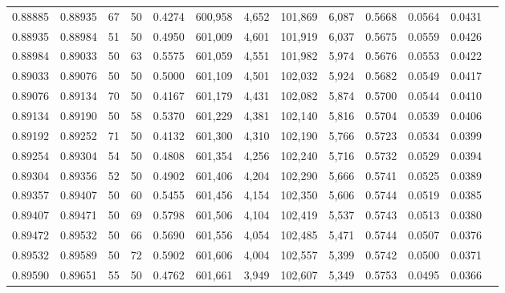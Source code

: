 \begin{tabular}{rrrrrrrrrrrrr}
0.88885 & 0.88935 &    67 &  50 &                                     0.4274 & 600,958 &   4,652 & 101,869 &   6,087 & 0.5668 & 0.0564 & 0.0431 \\
0.88935 & 0.88984 &    51 &  50 &                                     0.4950 & 601,009 &   4,601 & 101,919 &   6,037 & 0.5675 & 0.0559 & 0.0426 \\
0.88984 & 0.89033 &    50 &  63 &                                     0.5575 & 601,059 &   4,551 & 101,982 &   5,974 & 0.5676 & 0.0553 & 0.0422 \\
0.89033 & 0.89076 &    50 &  50 &                                     0.5000 & 601,109 &   4,501 & 102,032 &   5,924 & 0.5682 & 0.0549 & 0.0417 \\
0.89076 & 0.89134 &    70 &  50 &                                     0.4167 & 601,179 &   4,431 & 102,082 &   5,874 & 0.5700 & 0.0544 & 0.0410 \\
0.89134 & 0.89190 &    50 &  58 &                                     0.5370 & 601,229 &   4,381 & 102,140 &   5,816 & 0.5704 & 0.0539 & 0.0406 \\
0.89192 & 0.89252 &    71 &  50 &                                     0.4132 & 601,300 &   4,310 & 102,190 &   5,766 & 0.5723 & 0.0534 & 0.0399 \\
0.89254 & 0.89304 &    54 &  50 &                                     0.4808 & 601,354 &   4,256 & 102,240 &   5,716 & 0.5732 & 0.0529 & 0.0394 \\
0.89304 & 0.89356 &    52 &  50 &                                     0.4902 & 601,406 &   4,204 & 102,290 &   5,666 & 0.5741 & 0.0525 & 0.0389 \\
0.89357 & 0.89407 &    50 &  60 &                                     0.5455 & 601,456 &   4,154 & 102,350 &   5,606 & 0.5744 & 0.0519 & 0.0385 \\
0.89407 & 0.89471 &    50 &  69 &                                     0.5798 & 601,506 &   4,104 & 102,419 &   5,537 & 0.5743 & 0.0513 & 0.0380 \\
0.89472 & 0.89532 &    50 &  66 &                                     0.5690 & 601,556 &   4,054 & 102,485 &   5,471 & 0.5744 & 0.0507 & 0.0376 \\
0.89532 & 0.89589 &    50 &  72 &                                     0.5902 & 601,606 &   4,004 & 102,557 &   5,399 & 0.5742 & 0.0500 & 0.0371 \\
0.89590 & 0.89651 &    55 &  50 &                                     0.4762 & 601,661 &   3,949 & 102,607 &   5,349 & 0.5753 & 0.0495 & 0.0366 \\

\end{tabular}

